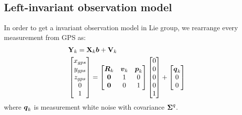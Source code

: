 \subsection{Left-invariant observation model}
In order to get a invariant observation model in Lie group, we rearrange every measurement from GPS as:
\begin{align}
    & \textbf{Y}_k = \textbf{X}_k \boldsymbol{b} + \textbf{V}_k \\
    & \begin{bmatrix}
        x_{gps} \\ y_{gps} \\ z_{gps} \\ 0 \\ 1
      \end{bmatrix} =
      \begin{bmatrix}
        \boldsymbol{R}_k & \boldsymbol{v}_k & \boldsymbol{p}_k \\
        \boldsymbol{0} & 1 & 0 \\
        \boldsymbol{0} & 0 & 1 \\
      \end{bmatrix}
      \begin{bmatrix}
        0 \\ 0 \\ 0\\ 0 \\ 1
      \end{bmatrix} +
      \begin{bmatrix}
        \boldsymbol{q}_k \\ 0 \\ 0
      \end{bmatrix}
\end{align}
where $\boldsymbol{q}_k$ is measurement white noise with covariance $\boldsymbol{\Sigma}^q$.

